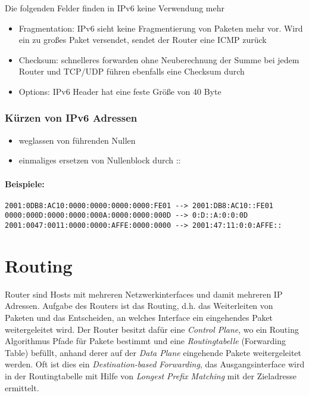 Die folgenden Felder finden in IPv6 keine Verwendung mehr
\begin{itemize}
    \item Fragmentation: IPv6 sieht keine Fragmentierung von Paketen mehr vor. Wird ein zu großes Paket versendet, sendet der Router eine ICMP zurück
    \item Checksum: schnelleres forwarden ohne Neuberechnung der Summe bei jedem Router und TCP/UDP führen ebenfalls eine Checksum durch
    \item Options: IPv6 Header hat eine feste Größe von 40 Byte
\end{itemize}

\subsubsection{Kürzen von IPv6 Adressen}
\begin{itemize}
    \item weglassen von führenden Nullen
    \item einmaliges ersetzen von Nullenblock durch ::
\end{itemize}

\paragraph{Beispiele:}
\hfill \break
\lstinline{2001:0DB8:AC10:0000:0000:0000:0000:FE01 --> 2001:DB8:AC10::FE01}\\
\lstinline{0000:000D:0000:0000:000A:0000:0000:000D --> 0:D::A:0:0:0D}\\
\lstinline{2001:0047:0011:0000:0000:AFFE:0000:0000 --> 2001:47:11:0:0:AFFE::}


\section{Routing}

Router sind Hosts mit mehreren Netzwerkinterfaces und damit mehreren IP Adressen. Aufgabe des Routers ist das Routing, d.h. das Weiterleiten von Paketen und das Entscheiden, an welches Interface ein eingehendes Paket weitergeleitet wird. Der Router besitzt dafür eine \emph{Control Plane}, wo ein Routing Algorithmus Pfade für Pakete bestimmt und eine \emph{Routingtabelle} (Forwarding Table) befüllt, anhand derer auf der \emph{Data Plane} eingehende Pakete weitergeleitet werden. Oft ist dies ein \emph{Destination-based Forwarding}, das Ausgangsinterface wird in der Routingtabelle mit Hilfe von \emph{Longest Prefix Matching} mit der Zieladresse ermittelt.

